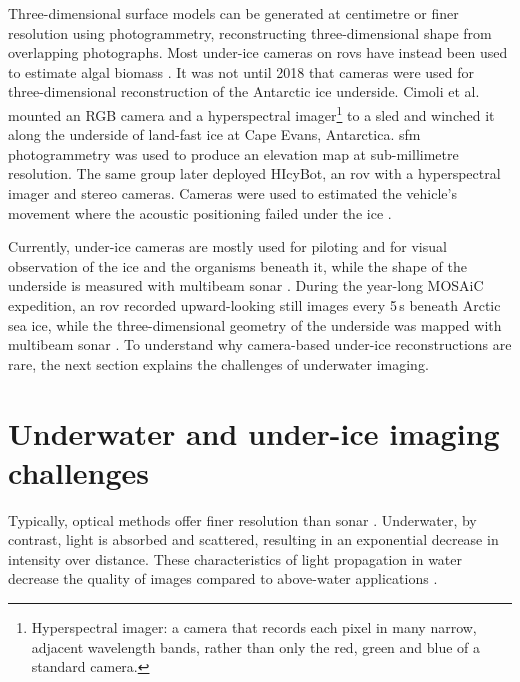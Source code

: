 Three-dimensional surface models can be generated at centimetre or finer resolution using photogrammetry, 
reconstructing three-dimensional shape from overlapping photographs. 
Most under-ice cameras on \glspl{rov} have instead been used to estimate 
algal biomass \cite{katleinNewRemotelyOperated2017}. It was not until 2018 that cameras were used for three-dimensional
 reconstruction of the Antarctic ice underside. Cimoli et al.~\cite{cimoliUnderIceHyperspectralRGB2019} mounted 
 an RGB camera and a hyperspectral imager\footnote{Hyperspectral imager: a camera that records each pixel in many narrow, adjacent wavelength bands, rather than only the red, green and blue of a standard camera.} to a sled and winched it along the underside of land-fast ice at Cape Evans, Antarctica.
\Gls{sfm} photogrammetry was used to produce an
elevation map at sub-millimetre resolution. The same group later deployed HIcyBot, an \gls{rov} with 
a hyperspectral imager and 
stereo cameras.
Cameras were used to estimated the vehicle's movement where the acoustic positioning failed under the ice \cite{cimoliAdvancingMonitoringNearshore2026}.

Currently, under-ice cameras are mostly used for piloting and for visual observation of the ice and the organisms beneath it,
while the shape of the underside is measured with multibeam sonar \cite{katleinNewRemotelyOperated2017}.
During the year-long MOSAiC expedition, an \gls{rov} recorded upward-looking still images every 5\,s 
beneath Arctic sea ice, while the three-dimensional geometry of the underside was mapped with 
multibeam sonar \cite{anhausUndericeEnvironmentObservations2025}. To understand why camera-based under-ice
reconstructions are rare, the
 next section explains the challenges of underwater imaging.

\section{Underwater and under-ice imaging challenges}
\label{sec:ch2.imaging_challenges}
Typically, optical methods offer finer resolution than sonar
\cite{kocakFocusRecentDevelopments2008,williamsThickDeformedAntarctic2015}.
Underwater, by contrast, light is absorbed and scattered, resulting in an exponential decrease in intensity over
distance. These characteristics of light propagation in water decrease the quality of
images compared to above-water applications \cite{jaffeComputerModelingDesign1990}.


